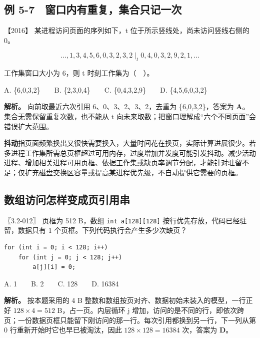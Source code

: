 \subsection{例 5-7　窗口内有重复，集合只记一次}\label{os-ex5-7}

\noindent{}【2016】 某进程访问页面的序列如下，t 位于所示竖线处，尚未访问竖线右侧的 0。

\[\ldots,1,3,4,5,6,0,3,2,3,2\;\big|_{t}\;0,4,0,3,2,9,2,1,\ldots\]

工作集窗口大小为 6，则 t 时刻工作集为（　）。

A. \{6,0,3,2\}　　B. \{2,3,0,4\}　　C. \{0,4,3,2,9\}　　D. \{4,5,6,0,3,2\}


\textbf{解析。} 向前取最近六次引用 6、0、3、2、3、2，去重为 \{6,0,3,2\}，答案为 \textbf{A}。集合无需保留重复次数，也不能从 t 向未来取数；把窗口理解成``六个不同页面''会错误扩大范围。

\textbf{抖动}指页面频繁换出又很快需要换入，大量时间花在换页，实际计算进展很少。若多进程工作集所需总页框超过可用内存，过度增加并发度可能引发抖动。减少活动进程、增加相关进程可用页框、依据工作集或缺页率调节分配，才能针对驻留不足；仅扩充磁盘交换区容量或提高某进程优先级，不自动提供它需要的页框。

\subsection{数组访问怎样变成页引用串}\label{os-c05-h249}

\noindent{}〖3.2-012〗 页框为 512 B，数组 \allowbreak{}\texttt{int\ a{[}128{]}{[}128{]}} 按行优先存放，代码已经驻留，数据只有 1 个页框。下列代码执行会产生多少次缺页？

\par\medskip\noindent
\begin{minipage}{\linewidth}
\begin{verbatim}
for (int i = 0; i < 128; i++)
    for (int j = 0; j < 128; j++)
        a[j][i] = 0;
\end{verbatim}
\end{minipage}\par\medskip

A. 1　　B. 2　　C. 128　　D. 16384


\textbf{解析。} 按本题采用的 4 B 整数和数组按页对齐、数据初始未装入的模型，一行正好 \(128\times4=512\) B，占一页。内层循环 j 增加，访问的是不同的行，即依次跨页；一份数据页框只能留下刚访问的那一行。每次引用都换到另一行，下一列从第 0 行重新开始时它也早已被淘汰，因此 \(128\times128=16384\) 次，答案为 \textbf{D}。

